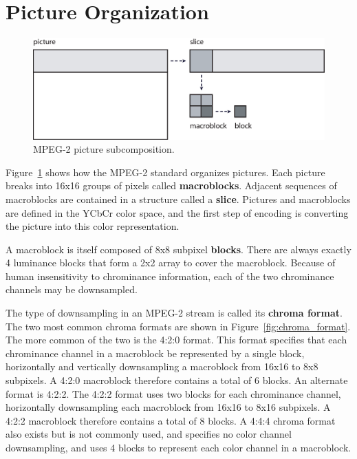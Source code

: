 \section{Picture Organization} 
\label{section:picture_decomp}

\begin{figure}
  \begin{center}
    \includegraphics[scale=0.8, angle=0]{./picture_structure.eps}
    \caption{MPEG-2 picture subcomposition.}
    \label{fig:picture_structure}
  \end{center}
\end{figure}

Figure~\ref{fig:picture_structure} shows how the MPEG-2 standard
organizes pictures. Each picture breaks into 
16x16 groups of pixels called \textbf{macroblocks}. 
Adjacent sequences of macroblocks
are contained in a structure called a \textbf{slice}.
Pictures and macroblocks are defined in the
YCbCr color space, and the first step of encoding is
converting the picture into this color representation.

A macroblock is itself composed of 8x8 subpixel 
\textbf{blocks}. There are always
exactly 4 luminance blocks that form a 2x2 array to cover the
macroblock. Because of human insensitivity to chrominance information, each of the two
chrominance channels may be downsampled. 

The type of downsampling in an MPEG-2 stream is called its
\textbf{chroma format}. The two most common chroma formats
are shown in Figure~\ref{fig:chroma_format}. The more common of the two 
is the 4:2:0 format.
This format specifies that each chrominance channel in a macroblock be represented
by a single block, horizontally and vertically
downsampling a macroblock from 16x16 to 8x8 subpixels. 
A 4:2:0 macroblock therefore contains a total of 6 blocks.
An alternate format is 4:2:2. 
The 4:2:2 format uses two blocks for each chrominance 
channel, horizontally downsampling each macroblock from 16x16 to 
8x16 subpixels. 
A 4:2:2 macroblock therefore contains a total of 8 blocks.
A 4:4:4 chroma format also exists but is not commonly used, and specifies 
no color channel downsampling, and uses 4 blocks to 
represent each color channel in a macroblock. 

